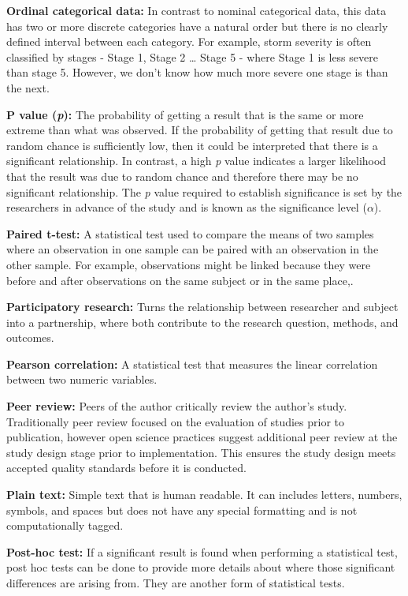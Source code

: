 \documentclass[
]{book}
\begin{document}
\textbf{Ordinal categorical data:} In contrast to nominal categorical data, this data has two or more discrete categories have a natural order but there is no clearly defined interval between each category. For example, storm severity is often classified by stages - Stage 1, Stage 2 \ldots{} Stage 5 - where Stage 1 is less severe than stage 5. However, we don't know how much more severe one stage is than the next.

\textbf{P value (\emph{p}):} The probability of getting a result that is the same or more extreme than what was observed. If the probability of getting that result due to random chance is sufficiently low, then it could be interpreted that there is a significant relationship. In contrast, a high \emph{p} value indicates a larger likelihood that the result was due to random chance and therefore there may be no significant relationship. The \emph{p} value required to establish significance is set by the researchers in advance of the study and is known as the significance level (\(\alpha\)).

\textbf{Paired t-test:} A statistical test used to compare the means of two samples where an observation in one sample can be paired with an observation in the other sample. For example, observations might be linked because they were before and after observations on the same subject or in the same place,.

\textbf{Participatory research:} Turns the relationship between researcher and subject into a partnership, where both contribute to the research question, methods, and outcomes.

\textbf{Pearson correlation:} A statistical test that measures the linear correlation between two numeric variables.

\textbf{Peer review:} Peers of the author critically review the author's study. Traditionally peer review focused on the evaluation of studies prior to publication, however open science practices suggest additional peer review at the study design stage prior to implementation. This ensures the study design meets accepted quality standards before it is conducted.

\textbf{Plain text:} Simple text that is human readable. It can includes letters, numbers, symbols, and spaces but does not have any special formatting and is not computationally tagged.

\textbf{Post-hoc test:} If a significant result is found when performing a statistical test, post hoc tests can be done to provide more details about where those significant differences are arising from. They are another form of statistical tests.
\end{document}
